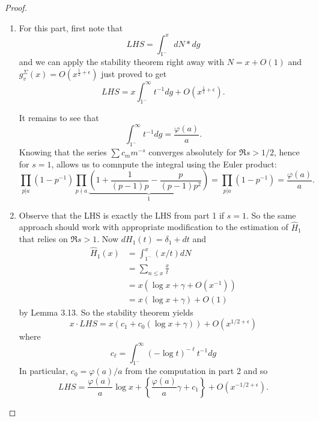 \documentclass[12pt]{article}
\begin{document}
\begin{proof}
\begin{enumerate}
\item For this part, first note that
$$LHS = \int_{1^-}^{x} dN * dg$$
and we can apply the stability theorem right away with $N = x + O(1)$ and $g^\Sigma_v(x) = O(x^{\frac 12 + \epsilon})$ just proved to get
$$LHS = x \int_{1^-}^{\infty} t^{-1} dg + O(x^{\frac 12 + \epsilon}).$$

It remains to see that
$$\int_{1^-}^{\infty} t^{-1} dg = \frac{\varphi(a)}{a}.$$
Knowing that the series $\sum c_m m^{-s}$ converges absolutely for $\Re s > 1/2$, hence for $s = 1$, allows us to comnpute the integral using the Euler product:
$$\prod_{p|a}(1 - p^{-1}) \prod_{p \nmid a} \underbrace{\left( 1 + \frac{1}{(p-1)p} - \frac{p}{(p-1)p^2} \right)}_{1} = \prod_{p|a}(1 - p^{-1}) = \frac{\varphi(a)}{a}.$$

\item Observe that the LHS is exactly the LHS from part 1 if $s = 1$. So the same approach should work with appropriate modification to the estimation of $\widehat{H}_1$ that relies on $\Re s > 1$. Now $d H_1(t) = \delta_1 + dt$ and
\begin{align*}
\widehat{H}_1(x) &= \int_{1^-}^x (x/t) dN\\
&= \sum_{n \leq x} \frac{x}{t}\\
&= x( \log x + \gamma + O(x^{-1}))\\
&= x (\log x + \gamma) + O(1)
\end{align*}
by Lemma 3.13. So the stability theorem yields
$$x \cdot LHS = x (c_1 + c_0(\log x + \gamma)) + O(x^{1/2 + \epsilon})$$
where
$$c_\ell = \int_{1^-}^\infty (-\log t)^{-\ell} t^{-1} dg$$
In particular, $c_0 = \varphi(a)/a$ from the computation in part 2 and so
$$LHS = \frac{\varphi(a)}{a} \log x + \left\{ \frac{\varphi(a)}{a} \gamma + c_1 \right\} + O(x^{-1/2 + \epsilon}).$$
\end{enumerate}
\end{proof}

\unless\ifdefined\IsMainDocument
\end{document}
